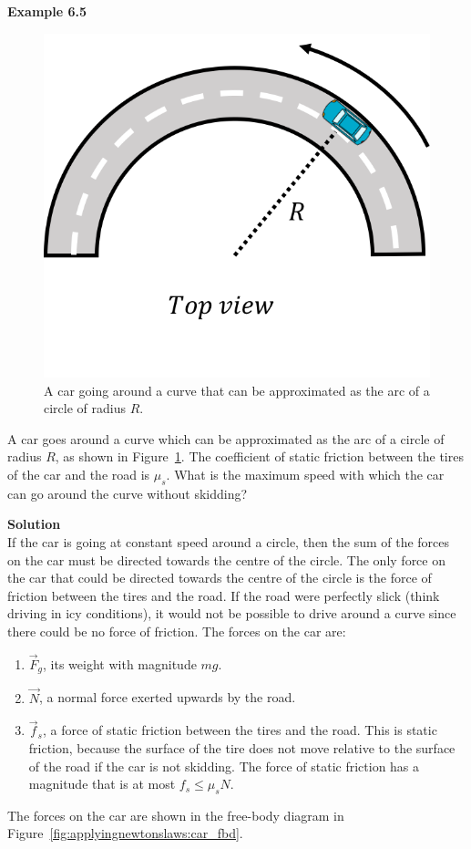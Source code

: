 \begin{framed}
\textbf{Example 6.5}\\
\begin{figure}[!htbp]
\centering
\includegraphics[width=0.25\linewidth]{files/car-bf4ad6e87eff6afa0747d345878e1215.png}
\caption[]{A car going around a curve that can be approximated as the arc of a circle of radius $R$.}
\label{fig:applyingnewtonslaws:car}
\end{figure}

A car goes around a curve which can be approximated as the arc of a circle of radius $R$, as shown in Figure~\ref{fig:applyingnewtonslaws:car}. The coefficient of static friction between the tires of the car and the road is $\mu_s$. What is the maximum speed with which the car can go around the curve without skidding?

\begin{framed}
\textbf{Solution}\\
If the car is going at constant speed around a circle, then the sum of the forces on the car must be directed towards the centre of the circle. The only force on the car that could be directed towards the centre of the circle is the force of friction between the tires and the road. If the road were perfectly slick (think driving in icy conditions), it would not be possible to drive around a curve since there could be no force of friction. The forces on the car are:

\begin{enumerate}
\item $\vec F_g$, its weight with magnitude $mg$.
\item $\vec N$, a normal force exerted upwards by the road.
\item $\vec f_s$, a force of static friction between the tires and the road. This is static friction, because the surface of the tire does not move relative to the surface of the road if the car is not skidding. The force of static friction has a magnitude that is at most $f_s\leq\mu_sN$.
\end{enumerate}

The forces on the car are shown in the free-body diagram in Figure~\ref{fig:applyingnewtonslaws:car_fbd}.


\end{framed}
\end{framed}
